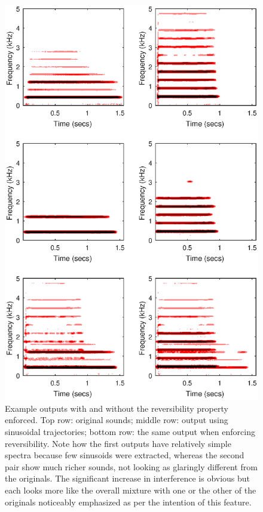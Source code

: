 \documentclass[12pt,a4paper,twoside,openright]{report}
\begin{document}
\begin{figure}
\centering
\includegraphics[width=0.7\linewidth]{../OutputSpectrograms/reversibilitySinCompSpecs}
\caption[Example outputs with and without the reversibility property enforced.]{Example outputs with and without the reversibility property enforced. Top row: original sounds; middle row: output using sinusoidal trajectories; bottom row: the same output when enforcing reversibility. Note how the first outputs have relatively simple spectra because few sinusoids were extracted, whereas the second pair show much richer sounds, not looking as glaringly different from the originals. The significant increase in interference is obvious but each looks more like the overall mixture with one or the other of the originals noticeably emphasized as per the intention of this feature.}
\label{fig:reversibilitySinCompSpecs}
\end{figure}

\end{document}
